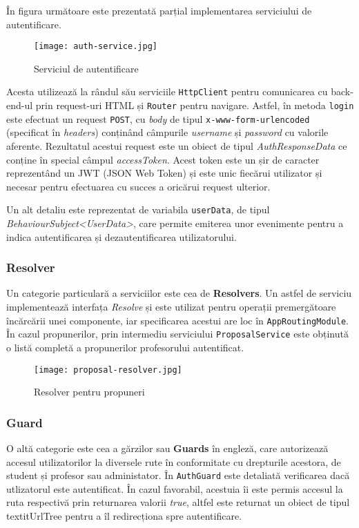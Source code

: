 În figura următoare este prezentată parțial implementarea serviciului de autentificare.

\begin{figure}[H]
	\centering
	\texttt{[image: auth-service.jpg]}
	\caption{Serviciul de autentificare}
\end{figure}

Acesta utilizează la rândul său serviciile \texttt{HttpClient} pentru comunicarea cu back-end-ul prin request-uri HTML și \texttt{Router} pentru navigare. Astfel, în metoda \texttt{login} este efectuat un request \texttt{POST}, cu \textit{body} de tipul \texttt{x-www-form-urlencoded} (specificat în \textit{headers}) conținând câmpurile \textit{username} și \textit{password} cu valorile aferente. Rezultatul acestui request este un obiect de tipul \textit{AuthResponseData} ce conține în special câmpul \textit{accessToken}. Acest token este un șir de caracter reprezentând un JWT (JSON Web Token) și este unic fiecărui utilizator și necesar pentru efectuarea cu succes a oricărui request ulterior.

Un alt detaliu este reprezentat de variabila \texttt{userData}, de tipul \textit{BehaviourSubject<UserData>}, care permite emiterea unor evenimente pentru a indica autentificarea și dezautentificarea utilizatorului.

\subsubsection{Resolver}

Un categorie particulară a serviciilor este cea de \textbf{Resolvers}. Un astfel de serviciu implementează interfața \textit{Resolve} și este utilizat pentru operații premergătoare încărcării unei componente, iar specificarea acestui are loc în \texttt{AppRoutingModule}. În cazul propunerilor, prin intermediu serviciului \texttt{ProposalService} este obținută o listă completă a propunerilor profesorului autentificat.

\begin{figure}[H]
	\centering
	\texttt{[image: proposal-resolver.jpg]}
	\caption{Resolver pentru propuneri}
\end{figure}

\subsubsection{Guard}

O altă categorie este cea a gărzilor sau \textbf{Guards} în engleză, care autorizează accesul utilizatorilor la diversele rute în conformitate cu drepturile acestora, de student și profesor sau administator. În \texttt{AuthGuard} este detaliată verificarea dacă utlizatorul este autentificat. În cazul favorabil, acestuia îi este permis accesul la ruta respectivă prin returnarea valorii \textit{true}, altfel este returnat un obiect de tipul textit{UrlTree} pentru a îl redirecționa spre autentificare.

